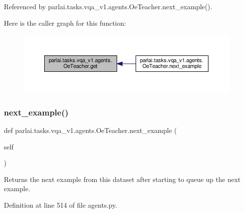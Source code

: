 Referenced by parlai.\+tasks.\+vqa\+\_\+v1.\+agents.\+Oe\+Teacher.\+next\+\_\+example().

Here is the caller graph for this function\+:
\nopagebreak
\begin{figure}[H]
\begin{center}
\leavevmode
\includegraphics[width=350pt]{classparlai_1_1tasks_1_1vqa__v1_1_1agents_1_1OeTeacher_a932ca5499779ef050d1fdb605c9e7f67_icgraph}
\end{center}
\end{figure}
\mbox{\label{classparlai_1_1tasks_1_1vqa__v1_1_1agents_1_1OeTeacher_a42df8da64edbf22fcc976b1cd02ef252}} 
\subsubsection{\texorpdfstring{next\+\_\+example()}{next\_example()}}
{\footnotesize\ttfamily def parlai.\+tasks.\+vqa\+\_\+v1.\+agents.\+Oe\+Teacher.\+next\+\_\+example (\begin{DoxyParamCaption}\item[{}]{self }\end{DoxyParamCaption})}

\begin{DoxyVerb}Returns the next example from this dataset after starting to queue
up the next example.
\end{DoxyVerb}
 

Definition at line 514 of file agents.\+py.




